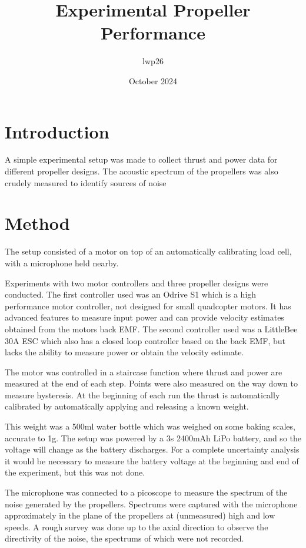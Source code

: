 \documentclass[8pt]{article}
\begin{document}


\title{Experimental Propeller Performance}
\author{lwp26}
\date{October 2024}
\maketitle

\section{Introduction}

A simple experimental setup was made to collect thrust and power data for different propeller designs.
The acoustic spectrum of the propellers was also crudely measured to identify sources of noise 


\section{Method}

The setup consisted of a motor on top of an automatically calibrating load cell, with a microphone held nearby.

Experiments with two motor controllers and three propeller designs were conducted.
The first controller used was an Odrive S1 which is a high performance motor controller, not designed for small quadcopter motors.
It has advanced features to measure input power and can provide velocity estimates obtained from the motors back EMF.
The second controller used was a LittleBee 30A ESC which also has a closed loop controller based on the back EMF, but lacks the ability to measure power or obtain the velocity estimate.

The motor was controlled in a staircase function where thrust and power are measured at the end of each step.
Points were also measured on the way down to measure hysteresis.
At the beginning of each run the thrust is automatically calibrated by automatically applying and releasing a known weight.

This weight was a 500ml water bottle which was weighed on some baking scales, accurate to 1g.
The setup was powered by a 3s 2400mAh LiPo battery, and so the voltage will change as the battery discharges.
For a complete uncertainty analysis it would be necessary to measure the battery voltage at the beginning and end of the experiment, but this was not done.

The microphone was connected to a picoscope to measure the spectrum of the noise generated by the propellers.
Spectrums were captured with the microphone approximately in the plane of the propellers at (unmeasured) high and low speeds.
A rough survey was done up to the axial direction to observe the directivity of the noise, the spectrums of which were not recorded.
\end{document}
